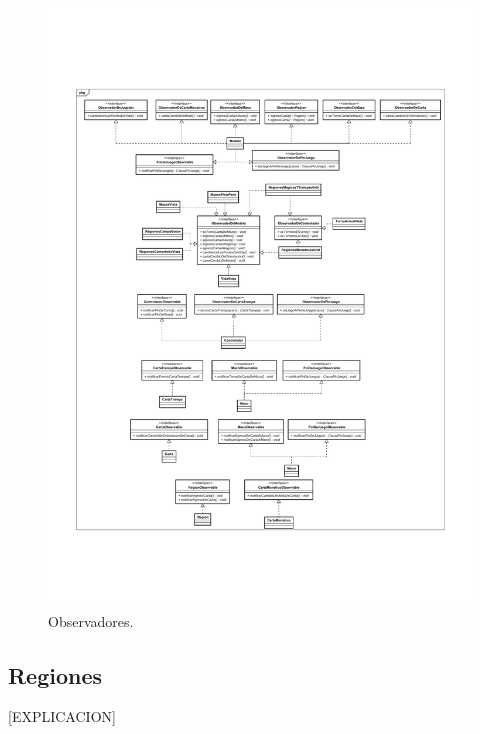 \begin{figure}[H]
	\centering
	\includegraphics[scale=0.8]{includes/class_Observadores}
	\caption{Observadores.}
	\label{class_Observadores}
\end{figure}

\subsection{Regiones}

[EXPLICACION]

